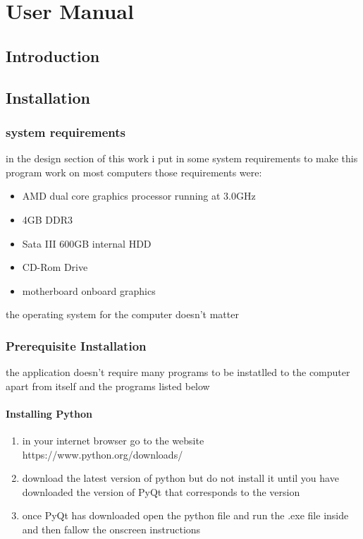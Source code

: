 \chapter{User Manual}

\section{Introduction}

\section{Installation}
\subsection{system requirements}
in the design section of this work i put in some system requirements to make this program work on most computers those requirements were:
\begin{itemize}
	\item AMD dual core graphics processor running at 3.0GHz
	\item 4GB DDR3 
	\item Sata III 600GB internal HDD
	\item CD-Rom Drive
	\item motherboard onboard graphics
\end{itemize}
the operating system for the computer doesn't matter
\subsection{Prerequisite Installation}
the application doesn't require many programs to be instatlled to the computer apart from itself and the programs listed below 
\subsubsection{Installing Python}
\begin{enumerate}
\item in your internet browser go to the website\newline
https://www.python.org/downloads/
\item download the latest version of python but do not install it until you have downloaded the version of PyQt that corresponds to the version 
\item once PyQt has downloaded open the python file and run the .exe file inside and then fallow the onscreen instructions
\end{enumerate}
